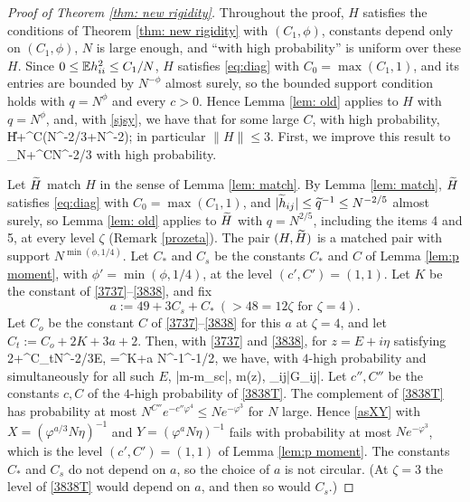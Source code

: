 \begin{proof}[Proof of Theorem \ref{thm: new rigidity}]
Throughout the proof, $H$ satisfies the conditions of Theorem \ref{thm: new rigidity} with $(C_1,\phi)$, constants depend only on $(C_1,\phi)$, $N$ is large enough, and ``with high probability'' is uniform over these $H$. Since $0\le\mathbb{E} h_{ii}^2\le C_1/N$, $H$ satisfies \eqref{eq:diag} with $C_0=\max(C_1,1)$, and its entries are bounded by $N^{-\phi}$ almost surely, so the bounded support condition holds with $q=N^{\phi}$ and every $c>0$. Hence Lemma \ref{lem: old} applies to $H$ with $q=N^\phi$, and, with \eqref{sjsy}, we have that for some large $C$, with high probability,
\be\label{tby}
\|H\|+\varphi^{C}(N^{-2/3}+N^{-2\phi});
\ee
in particular $\|H\|\le3$.
First, we improve this result to
\be\label{tby2}
\lambda_N+\varphi^{C}N^{-2/3}
\ee
with high probability.

Let $\widetilde H$ match $H$ in the sense of Lemma \ref{lem: match}. By Lemma \ref{lem: match}, $\widetilde H$ satisfies \eqref{eq:diag} with $C_0=\max(C_1,1)$, and $|\widetilde h_{ij}|\le\widetilde q^{-1}\le N^{-2/5}$ almost surely, so Lemma \ref{lem: old} applies to $\widetilde H$ with $q=N^{2/5}$, including the items 4 and 5, at every level $\zeta$ (Remark \ref{prozeta}). The pair $(H,\widetilde H)$ is a matched pair with support $N^{\min(\phi,1/4)}$. Let $C_*$ and $C_s$ be the constants $C_*$ and $C$ of Lemma \ref{lem:p moment}, with $\phi'=\min(\phi,1/4)$, at the level $(c',C')=(1,1)$. Let $K$ be the constant of \eqref{3737}--\eqref{3838}, and fix
$$
a:=49+3C_s+C_*\ (>48=12\zeta \text{ for } \zeta=4).
$$
Let $C_o$ be the constant $C$ of \eqref{3737}--\eqref{3838} for this $a$ at $\zeta=4$, and let $C_t:=C_o+2K+3a+2$. Then, with \eqref{3737} and \eqref{3838}, for $z=E+i\eta$ satisfying
\be \label{3737T}
2+\varphi^{C_t}N^{-2/3}\leq E, \quad \eta=\varphi^{K+a} N^{-1}\kappa^{-1/2},
\ee
we have, with $4$-high probability and simultaneously for all such $E$,
\be\label{3838T}
|\wt m-m_{sc}|\leq {}, \quad \im \wt m(z)\leq {},  \quad \max_{i\ne j}|\wt G_{ij}|\leq {}.
\ee
Let $c'',C''$ be the constants $c,C$ of the $4$-high probability of \eqref{3838T}. The complement of \eqref{3838T} has probability at most $N^{C''}e^{-c''\varphi^4}\le Ne^{-\varphi^3}$ for $N$ large. Hence \eqref{asXY} with $X=(\varphi^{a/3}N\eta)^{-1}$ and $Y=(\varphi^aN\eta)^{-1}$ fails with probability at most $Ne^{-\varphi^3}$, which is the level $(c',C')=(1,1)$ of Lemma \ref{lem:p moment}. The constants $C_*$ and $C_s$ do not depend on $a$, so the choice of $a$ is not circular. (At $\zeta=3$ the level of \eqref{3838T} would depend on $a$, and then so would $C_s$.)


\end{proof}
